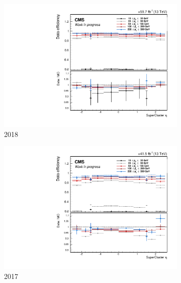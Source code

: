 \begin{figure}[htb!]
	\centering
	\captionsetup[subfigure]{justification=centering}
	\begin{subfigure}[h]{0.45\linewidth}
		\centering
		\includegraphics[width=\linewidth]{figs/05_analysis/UL2018_SFvseta_myWP.pdf}
		\caption{2018}
	\end{subfigure}
	\begin{subfigure}[h]{0.45\linewidth}
		\centering
		\includegraphics[width=\linewidth]{figs/05_analysis/UL2017_SFvseta_myWP.pdf}
		\caption{2017}
	\end{subfigure}
	\begin{subfigure}[h]{0.45\linewidth}
		\centering

\end{subfigure}
\end{figure}
